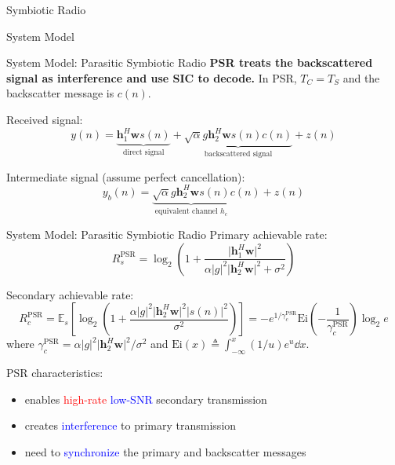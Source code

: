\documentclass[9pt]{beamer}
\begin{document}
\begin{section}{Symbiotic Radio}
\begin{subsection}{System Model}
			\begin{frame}{System Model: Parasitic Symbiotic Radio}
				\textbf{PSR treats the backscattered signal as interference and use SIC to decode.} In PSR, $T_{C}=T_{S}$ and the backscatter message is $c(n)$.

				\vspace{1em}

				Received signal:
				\begin{equation}
					y(n) = \underbrace{\boldsymbol{h}_1^H \boldsymbol{w} s(n)}_{\text{direct signal}} + \underbrace{\sqrt{\alpha}g \boldsymbol{h}_2^H \boldsymbol{w} s(n)c(n)}_{\text{backscattered signal}} + z(n)
				\end{equation}

				Intermediate signal (assume perfect cancellation):
				\begin{equation}
					y_{b}(n)=\underbrace{\sqrt{\alpha}g \boldsymbol{h}_2^H \boldsymbol{w} s(n)}_{\text{equivalent channel }h_{c}}c(n) + z(n)
				\end{equation}
			\end{frame}

			\begin{frame}{System Model: Parasitic Symbiotic Radio}
				Primary achievable rate:
				\begin{equation}
					R_{s}^{\text{PSR}}=\log_2{\left(1+\frac{\lvert{\boldsymbol{h}_1^H \boldsymbol{w}}\rvert^2}{\alpha \lvert{g}\rvert^2 \lvert{\boldsymbol{h}_2^H \boldsymbol{w}}\rvert^2 + \sigma^2}\right)}
				\end{equation}

				Secondary achievable rate:
				\begin{equation}
					R_{c}^{\text{PSR}}=\mathbb{E}_{s}\left[\log_2{\left(1+\frac{\alpha \lvert{g}\rvert^2 \lvert{\boldsymbol{h}_2^H \boldsymbol{w}}\rvert^2 \lvert{s(n)}\rvert^2}{\sigma^2}\right)}\right]
					=-e^{1/\gamma_c^{\text{PSR}}}\mathrm{Ei}(-\frac{1}{\gamma_c^{\text{PSR}}})\log_2{e}
				\end{equation}
				where $\gamma_c^{\text{PSR}}=\alpha \lvert{g}\rvert^2 \lvert{\boldsymbol{h}_2^H \boldsymbol{w}}\rvert^2/\sigma^2$ and $\mathrm{Ei}(x) \triangleq \int_{-\infty}^x (1/u)e^u \dd{x}$.

				\vspace{1em}

				PSR characteristics:
				\begin{itemize}
					\item enables \textcolor{red}{high-rate} \textcolor{blue}{low-SNR} secondary transmission
					\item creates \textcolor{blue}{interference} to primary transmission
					\item need to \textcolor{blue}{synchronize} the primary and backscatter messages
				\end{itemize}
			\end{frame}


\end{subsection}
\end{section}
\end{document}
